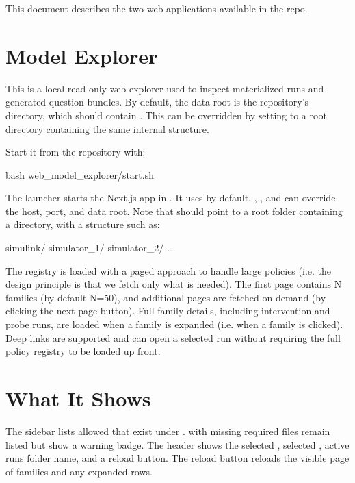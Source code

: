 \documentclass[11pt]{article}
\begin{document}
\label{docstart:web_model_explorer}
This document describes the two web applications available in the repo.
\section*{Model Explorer}

This is a local read-only web explorer used to inspect materialized \name{} runs and generated question bundles.
By default, the data root is the repository's  directory, which should contain .
This can be overridden by setting  to a root directory containing the same internal  structure.

Start it from the repository with:

\begin{DocCode}
bash web_model_explorer/start.sh
\end{DocCode}

The launcher starts the Next.js app in .
It uses  by default.
, , and  can override the host, port, and data root.
Note that  should point to a root folder containing a  directory, with a structure such as:
\begin{DocCode}
    simulink/
        simulator_1/
        simulator_2/
        \dots
\end{DocCode}




The registry is loaded with a paged approach to handle large policies (i.e. the design principle is that we fetch only what is needed).
The first page contains N families (by default N=50), and additional pages are fetched on demand (by clicking the next-page button).
Full family details, including intervention and probe runs, are loaded when a family is expanded (i.e. when a family is clicked).
Deep links are supported and can open a selected run without requiring the full policy registry to be loaded up front.



\section*{What It Shows}

The sidebar lists allowed \name{} \termSimulators that exist under .
\termSimulators with missing required files remain listed but show a warning badge.
The header shows the selected \termSimulator, selected , active runs folder name, and a reload button. 
The reload button reloads the visible page of families and any expanded rows.
\end{document}
